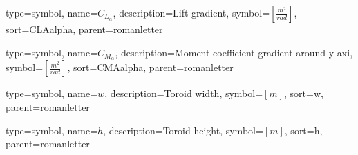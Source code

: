{
	type=symbol, %
	name={\ensuremath{C_{L_\alpha}}}, %
	description={Lift gradient}, %
	symbol={$\left[\frac{m^2}{rad}\right]$}, %
	sort=CLAalpha, %
	parent=romanletter %
}

{
	type=symbol, %
	name={\ensuremath{C_{M_\alpha}}}, %
	description={Moment coefficient gradient around y-axi}, %
	symbol={$\left[\frac{m^2}{rad}\right]$}, %
	sort=CMAalpha, %
	parent=romanletter %
}

{
	type=symbol, %
	name={\ensuremath{w}}, %
	description={Toroid width}, %
	symbol={$\left[m\right]$}, %
	sort=w, %
	parent=romanletter %
}

{
	type=symbol, %
	name={\ensuremath{h}}, %
	description={Toroid height}, %
	symbol={$\left[m\right]$}, %
	sort=h, %
	parent=romanletter %
}
